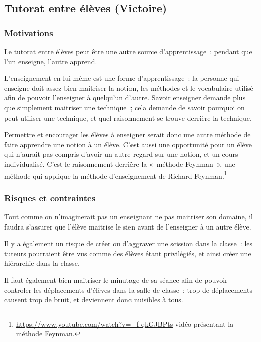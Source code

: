 \subsection{Tutorat entre élèves (Victoire)}
\subsubsection{Motivations}
Le tutorat entre élèves peut être une autre source d'apprentissage : pendant que
l'un enseigne, l'autre apprend.

L'enseignement en lui-même est une forme d'apprentissage : la personne qui
enseigne doit assez bien maitriser la notion, les méthodes et le vocabulaire
utilisé afin de pouvoir l'enseigner à quelqu'un d'autre. Savoir enseigner
demande plus que simplement maitriser une technique ; cela demande de savoir
pourquoi on peut utiliser une technique, et quel raisonnement se trouve derrière
la technique.

Permettre et encourager les élèves à enseigner serait donc une autre méthode de
faire apprendre une notion à un élève. C'est aussi une opportunité pour un élève
qui n'aurait pas compris d'avoir un autre regard sur une notion, et un cours
individualisé. C'est le raisonnement derrière la « méthode Feynman », une méthode
qui applique la méthode d'enseignement de Richard Feynman.\footnote{\url{https://www.youtube.com/watch?v=_f-qkGJBPts} vidéo présentant la méthode Feynman.}


\subsubsection{Risques et contraintes}

Tout comme on n'imaginerait pas un enseignant ne pas maitriser son domaine, il
faudra s'assurer que l'élève maitrise le sien avant de l'enseigner à un autre
élève.

Il y a également un risque de créer ou d'aggraver une scission dans la classe :
les tuteurs pourraient être vus comme des élèves étant privilégiés, et ainsi créer
une hiérarchie dans la classe.\cite{pedagogie_cooperative_hierarchie}

Il faut également bien maitriser le minutage de sa séance afin de pouvoir controler
les déplacements d'élèves dans la salle de classe : trop de déplacements causent
trop de bruit, et deviennent donc nuisibles à tous.


